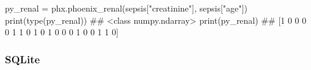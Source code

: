 \documentclass[
  letterpaper,
  DIV=11,
  numbers=noendperiod]{scrartcl}
\newenvironment{Shaded}{\begin{snugshade}}{\end{snugshade}}
\newcommand{\BuiltInTok}[1]{\textcolor[rgb]{0.00,0.23,0.31}{#1}}
\newcommand{\CommentTok}[1]{\textcolor[rgb]{0.37,0.37,0.37}{#1}}
\newcommand{\NormalTok}[1]{\textcolor[rgb]{0.00,0.23,0.31}{#1}}
\newcommand{\OperatorTok}[1]{\textcolor[rgb]{0.37,0.37,0.37}{#1}}
\newcommand{\StringTok}[1]{\textcolor[rgb]{0.13,0.47,0.30}{#1}}
\begin{document}
\begin{Shaded}
\begin{Highlighting}[]
\NormalTok{py\_renal }\OperatorTok{=}\NormalTok{ phx.phoenix\_renal(sepsis[}\StringTok{"creatinine"}\NormalTok{], sepsis[}\StringTok{"age"}\NormalTok{])}
\BuiltInTok{print}\NormalTok{(}\BuiltInTok{type}\NormalTok{(py\_renal))}
\CommentTok{\#\# \textless{}class \textquotesingle{}numpy.ndarray\textquotesingle{}\textgreater{}}
\BuiltInTok{print}\NormalTok{(py\_renal)}
\CommentTok{\#\# [1 0 0 0 0 1 1 0 1 0 1 0 0 0 1 0 0 1 1 0]}
\end{Highlighting}
\end{Shaded}

\subsubsection{SQLite}\label{sqlite-6}
\end{document}
